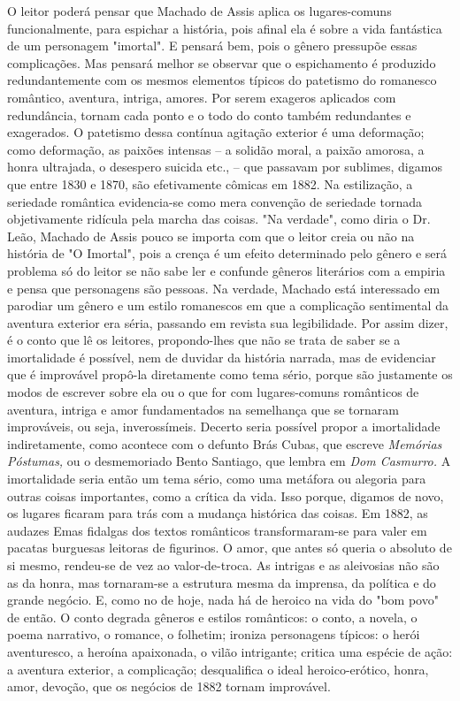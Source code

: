 O leitor poderá pensar que Machado de Assis aplica os lugares-comuns
funcionalmente, para espichar a história, pois afinal ela é sobre a vida
fantástica de um personagem "imortal". E pensará bem, pois o gênero
pressupõe essas complicações. Mas pensará melhor se observar que o
espichamento é produzido redundantemente com os mesmos elementos típicos
do patetismo do romanesco romântico, aventura, intriga, amores. Por
serem exageros aplicados com redundância, tornam cada ponto e o todo do
conto também redundantes e exagerados. O patetismo dessa contínua
agitação exterior é uma deformação; como deformação, as paixões intensas
-- a solidão moral, a paixão amorosa, a honra ultrajada, o desespero
suicida etc., -- que passavam por sublimes, digamos que entre 1830 e
1870, são efetivamente cômicas em 1882. Na estilização, a seriedade
romântica evidencia-se como mera convenção de seriedade tornada
objetivamente ridícula pela marcha das coisas. "Na verdade", como diria
o Dr. Leão, Machado de Assis pouco se importa com que o leitor creia ou
não na história de "O Imortal", pois a crença é um efeito determinado
pelo gênero e será problema só do leitor se não sabe ler e confunde
gêneros literários com a empiria e pensa que personagens são pessoas. Na
verdade, Machado está interessado em parodiar um gênero e um estilo
romanescos em que a complicação sentimental da aventura exterior era
séria, passando em revista sua legibilidade. Por assim dizer, é o conto
que lê os leitores, propondo-lhes que não se trata de saber se a
imortalidade é possível, nem de duvidar da história narrada, mas de
evidenciar que é improvável propô-la diretamente como tema sério, porque
são justamente os modos de escrever sobre ela ou o que for com
lugares-comuns românticos de aventura, intriga e amor fundamentados na
semelhança que se tornaram improváveis, ou seja, inverossímeis. Decerto
seria possível propor a imortalidade indiretamente, como acontece com o
defunto Brás Cubas, que escreve \emph{Memórias Póstumas,} ou o
desmemoriado Bento Santiago, que lembra em \emph{Dom Casmurro.} A
imortalidade seria então um tema sério, como uma metáfora ou alegoria
para outras coisas importantes, como a crítica da vida. Isso porque,
digamos de novo, os lugares ficaram para trás com a mudança histórica
das coisas. Em 1882, as audazes Emas fidalgas dos textos românticos
transformaram-se para valer em pacatas burguesas leitoras de figurinos.
O amor, que antes só queria o absoluto de si mesmo, rendeu-se de vez ao
valor-de-troca. As intrigas e as aleivosias não são as da honra, mas
tornaram-se a estrutura mesma da imprensa, da política e do grande
negócio. E, como no de hoje, nada há de heroico na vida do "bom povo" de
então. O conto degrada gêneros e estilos românticos: o conto, a novela,
o poema narrativo, o romance, o folhetim; ironiza personagens típicos: o
herói aventuresco, a heroína apaixonada, o vilão intrigante; critica uma
espécie de ação: a aventura exterior, a complicação; desqualifica o
ideal heroico-erótico, honra, amor, devoção, que os negócios de 1882
tornam improvável.

